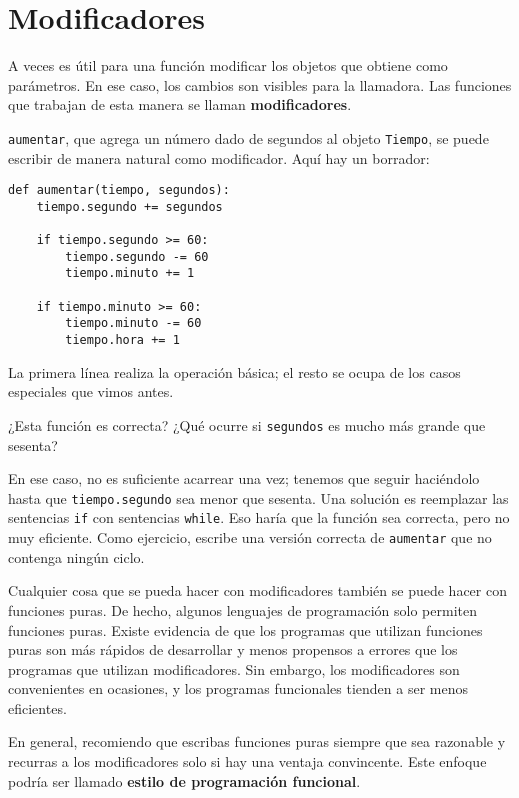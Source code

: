 \documentclass[10pt]{book}
\begin{document}
\section{Modificadores}
\label{increment}

A veces es útil para una función modificar los objetos que obtiene como
parámetros.  En ese caso, los cambios son visibles para la llamadora.
Las funciones que trabajan de esta manera se llaman {\bf modificadores}.

{\tt aumentar}, que agrega un número dado de segundos al objeto {\tt Tiempo},
se puede escribir de manera natural como
modificador.  Aquí hay un borrador:

\begin{verbatim}
def aumentar(tiempo, segundos):
    tiempo.segundo += segundos

    if tiempo.segundo >= 60:
        tiempo.segundo -= 60
        tiempo.minuto += 1

    if tiempo.minuto >= 60:
        tiempo.minuto -= 60
        tiempo.hora += 1
\end{verbatim}
%
La primera línea realiza la operación básica; el resto se ocupa
de los casos especiales que vimos antes.

¿Esta función es correcta?  ¿Qué ocurre si {\tt segundos}
es mucho más grande que sesenta?

En ese caso, no es suficiente acarrear una vez; tenemos que seguir haciéndolo
hasta que {\tt tiempo.segundo} sea menor que sesenta.  Una solución es
reemplazar las sentencias {\tt if} con sentencias {\tt while}.  Eso
haría que la función sea correcta, pero no muy eficiente.  Como
ejercicio, escribe una versión correcta de {\tt aumentar} que no
contenga ningún ciclo.

Cualquier cosa que se pueda hacer con modificadores también se puede hacer con funciones
puras.  De hecho, algunos lenguajes de programación solo permiten funciones
puras.  Existe evidencia de que los programas que utilizan funciones puras
son más rápidos de desarrollar y menos propensos a errores que los programas
que utilizan modificadores.  Sin embargo, los modificadores son convenientes en ocasiones,
y los programas funcionales tienden a ser menos eficientes.

En general, recomiendo que escribas funciones puras siempre que sea
razonable y recurras a los modificadores solo si hay una ventaja
convincente.  Este enfoque podría ser llamado {\bf estilo de
programación funcional}.
\end{document}
